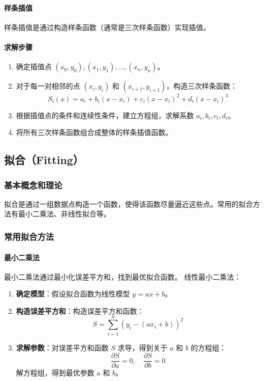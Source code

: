 \documentclass[UTF8]{ctexart}
\begin{document}
\paragraph{样条插值}
样条插值是通过构造样条函数（通常是三次样条函数）实现插值。
\paragraph{求解步骤}
\begin{enumerate}
    \item 确定插值点 \( (x_0, y_0), (x_1, y_1), \ldots, (x_n, y_n) \)。
    \item 对于每一对相邻的点 \( (x_i, y_i) \) 和 \( (x_{i+1}, y_{i+1}) \)，构造三次样条函数：
    \[
    S_i(x) = a_i + b_i (x - x_i) + c_i (x - x_i)^2 + d_i (x - x_i)^3
    \]
    \item 根据插值点的条件和连续性条件，建立方程组，求解系数 \(a_i, b_i, c_i, d_i\)。
    \item 将所有三次样条函数组合成整体的样条插值函数。
\end{enumerate}

\subsection {拟合（Fitting）}
\subsubsection {基本概念和理论}
拟合是通过一组数据点构造一个函数，使得该函数尽量逼近这些点。常用的拟合方法有最小二乘法、非线性拟合等。

\subsubsection {常用拟合方法}
\paragraph{最小二乘法}
最小二乘法通过最小化误差平方和，找到最优拟合函数。
线性最小二乘法：
\begin{enumerate}
    \item \textbf{确定模型}：假设拟合函数为线性模型 \( y = ax + b \)。
    \item \textbf{构造误差平方和}：构造误差平方和函数：
    \[
    S = \sum_{i=1}^{n} (y_i - (ax_i + b))^2
    \]
    \item \textbf{求解参数}：对误差平方和函数 \( S \) 求导，得到关于 \( a \) 和 \( b \) 的方程组：
    \[
    \frac{\partial S}{\partial a} = 0, \quad \frac{\partial S}{\partial b} = 0
    \]
    解方程组，得到最优参数 \( a \) 和 \( b \)。
\end{enumerate}
\end{document}
